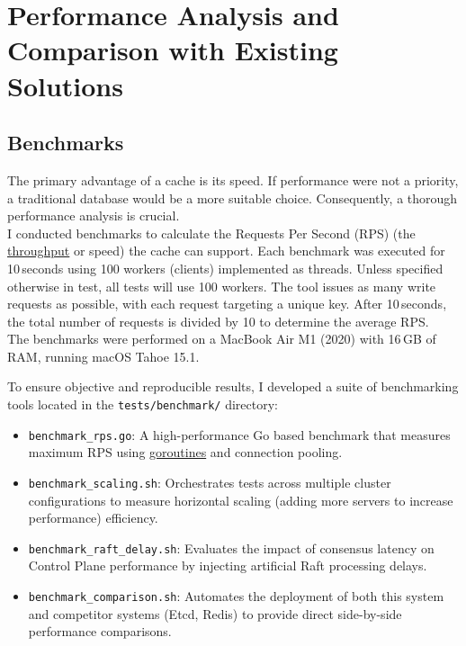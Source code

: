 \documentclass[shortabstract]{iithesis}
\begin{document}

\chapter{Performance Analysis and Comparison with Existing Solutions}

\section{Benchmarks}
The primary advantage of a cache is its speed. If performance were not a priority, a traditional database would be a more suitable choice. Consequently, a thorough performance analysis is crucial. \\
I conducted benchmarks to calculate the Requests Per Second (RPS) (the \hyperref[def:throughput]{throughput} or speed) the cache can support. Each benchmark was executed for 10\,seconds using 100 workers (clients) implemented as threads. Unless specified otherwise in test, all tests will use 100 workers. The tool issues as many write requests as possible, with each request targeting a unique key. After 10\,seconds, the total number of requests is divided by 10 to determine the average RPS. \\

\noindent The benchmarks were performed on a MacBook Air M1 (2020) with 16\,GB of RAM, running macOS Tahoe 15.1.

To ensure objective and reproducible results, I developed a suite of benchmarking tools located in the \texttt{tests/benchmark/} directory:
\begin{itemize}
    \item \texttt{benchmark\_rps.go}: A high-performance Go based benchmark that measures maximum RPS using \hyperref[def:goroutine]{goroutines} and connection pooling.
    \item \texttt{benchmark\_scaling.sh}: Orchestrates tests across multiple cluster configurations to measure horizontal scaling (adding more servers to increase performance) efficiency.
    \item \texttt{benchmark\_raft\_delay.sh}: Evaluates the impact of consensus latency on Control Plane performance by injecting artificial Raft processing delays.
    \item \texttt{benchmark\_comparison.sh}: Automates the deployment of both this system and competitor systems (Etcd, Redis) to provide direct side-by-side performance comparisons.
\end{itemize}
\end{document}
